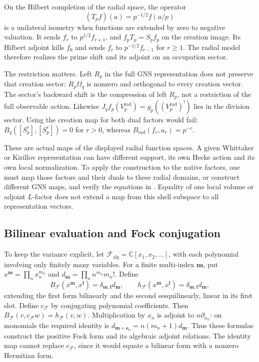 On the Hilbert completion of the radial space, the operator
\[
 (T_pf)(a)=p^{-1/2}f(a/p)
\]
is a unilateral isometry when functions are extended by zero to
negative valuation. It sends $f_r$ to $p^{1/2}f_{r+1}$, and
$f_pT_p=S_pf_p$ on the creation image. Its Hilbert adjoint kills
$f_0$ and sends $f_r$ to $p^{-1/2}f_{r-1}$ for $r\geq1$.
The radial model therefore realizes the prime shift and its
adjoint on an occupation sector.

The restriction matters. Left $R_p$ in the full GNS
representation does not preserve that creation sector:
$R_p\Omega_q$ is nonzero and orthogonal to every creation vector.
The sector's backward shift is the compression of left $R_p$,
not a restriction of the full observable action. Likewise
$J_qf_p(V_p^{\mathrm{rad}})=g_p((V_p^{\mathrm{rad}})^!)$ lies
in the division sector. Using the creation map for both dual
factors would fail: $B_q([S_p^r],[S_p^r])=0$ for $r>0$,
whereas $B_{\mathrm{rad}}(f_r,a_r)=p^{-r}$.

These are actual maps of the displayed radial function spaces.
A given Whittaker or Kirillov representation can have different
support, its own Hecke action and its own local normalization.
To apply the construction to the native factors, one must map
those factors and their duals to these radial domains, or
construct different GNS maps, and verify the equations in
. Equality of one
local volume or adjoint $L$-factor does not extend a map from
this shell subspace to all representation vectors.

\subsection{Bilinear evaluation and Fock conjugation}
\label{v4-arith:kp:arch-koszul}
\label{v4-arith:kp:arch:Koszul-infty}
\label{v4-arith:kp:arch-koszul:pairing}

To keep the variance explicit, let \(\mathcal F_{\mathrm{alg}}=
\mathbb C[x_1,x_2,\ldots]\), with each polynomial involving only
finitely many variables. For a finite multi-index \(\mathbf m\), put
\(x^{\mathbf m}=\prod_nx_n^{m_n}\) and
\(d_{\mathbf m}=\prod_n n^{m_n}m_n!\). Define
\[
 B_{\mathcal F}(x^{\mathbf m},x^{\mathbf l})
       =\delta_{\mathbf m,\mathbf l}d_{\mathbf m},\qquad
 h_{\mathcal F}(x^{\mathbf m},x^{\mathbf l})
       =\delta_{\mathbf m,\mathbf l}d_{\mathbf m},
\]
extending the first form bilinearly and the second sesquilinearly,
linear in its first slot. Define \(c_{\mathcal F}\) by conjugating
polynomial coefficients. Then
\(B_{\mathcal F}(v,c_{\mathcal F}w)=h_{\mathcal F}(v,w)\).
Multiplication by \(x_n\) is adjoint to \(n\partial_{x_n}\): on
monomials the required identity is
\(d_{\mathbf m+\mathbf e_n}=n(m_n+1)d_{\mathbf m}\).
Thus these formulas construct the positive Fock form and its algebraic
adjoint relations. The identity map cannot replace
\(c_{\mathcal F}\), since it would equate a bilinear form with a
nonzero Hermitian form.

